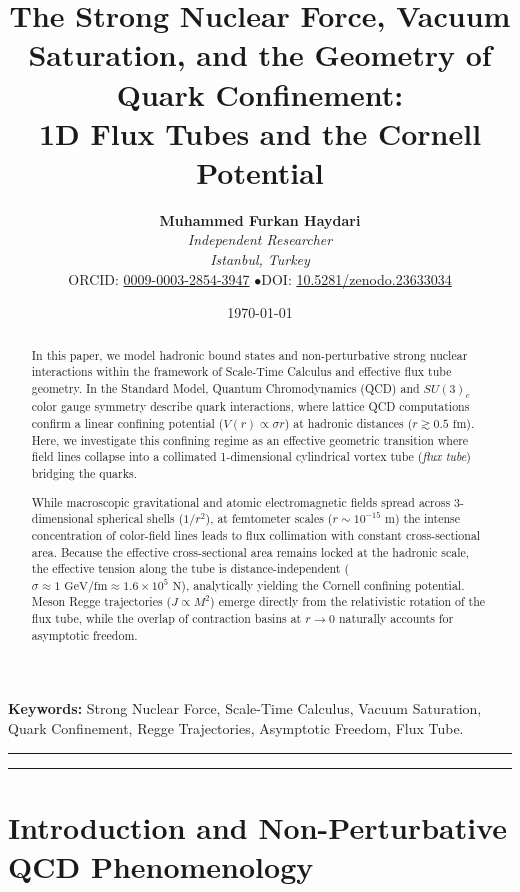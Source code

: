 \documentclass[11pt,a4paper]{article}
\title{\textbf{The Strong Nuclear Force, Vacuum Saturation, and the Geometry of Quark Confinement: \\ 1D Flux Tubes and the Cornell Potential}}
\author{
    \textbf{Muhammed Furkan Haydari} \\
    \textit{Independent Researcher} \\
    \textit{Istanbul, Turkey} \\
    \small ORCID: \href{https://orcid.org/0009-0003-2854-3947}{0009-0003-2854-3947} \quad$\bullet$\quad \small DOI: \href{https://doi.org/10.5281/zenodo.23633034}{10.5281/zenodo.23633034}
}
\date{\today}
\begin{document}
\maketitle

\begin{abstract}
    In this paper, we model hadronic bound states and non-perturbative strong nuclear interactions within the framework of Scale-Time Calculus and effective flux tube geometry. In the Standard Model, Quantum Chromodynamics (QCD) and $SU(3)_c$ color gauge symmetry describe quark interactions, where lattice QCD computations confirm a linear confining potential ($V(r) \propto \sigma r$) at hadronic distances ($r \gtrsim 0.5\text{ fm}$). Here, we investigate this confining regime as an effective geometric transition where field lines collapse into a collimated 1-dimensional cylindrical vortex tube (\textit{flux tube}) bridging the quarks.

    While macroscopic gravitational and atomic electromagnetic fields spread across 3-dimensional spherical shells ($1/r^2$), at femtometer scales ($r \sim 10^{-15}\text{ m}$) the intense concentration of color-field lines leads to flux collimation with constant cross-sectional area. Because the effective cross-sectional area remains locked at the hadronic scale, the effective tension along the tube is distance-independent ($\sigma \approx 1\text{ GeV/fm} \approx 1.6 \times 10^5\text{ N}$), analytically yielding the Cornell confining potential. Meson Regge trajectories ($J \propto M^2$) emerge directly from the relativistic rotation of the flux tube, while the overlap of contraction basins at $r \to 0$ naturally accounts for asymptotic freedom.
\end{abstract}

\vspace{1em}
\noindent\textbf{Keywords:} Strong Nuclear Force, Scale-Time Calculus, Vacuum Saturation, Quark Confinement, Regge Trajectories, Asymptotic Freedom, Flux Tube.

\vspace{1em}
\hrule
\vspace{0.8em}
\tableofcontents
\vspace{0.8em}
\hrule
\vspace{1.5em}

\section{Introduction and Non-Perturbative QCD Phenomenology}
\label{sec:giris}
\end{document}

